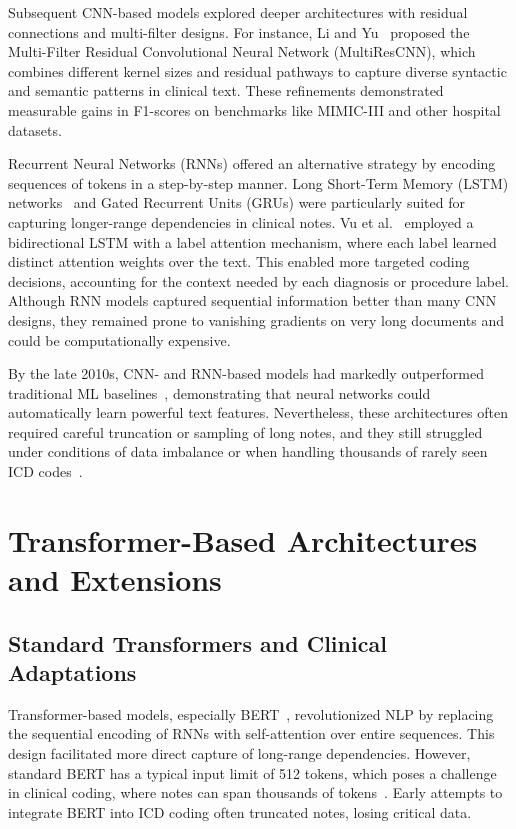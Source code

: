 Subsequent CNN-based models explored deeper architectures with residual connections and multi-filter designs. For instance, Li and Yu~\citep{li2020multi} proposed the Multi-Filter Residual Convolutional Neural Network (MultiResCNN), which combines different kernel sizes and residual pathways to capture diverse syntactic and semantic patterns in clinical text. These refinements demonstrated measurable gains in F1-scores on benchmarks like MIMIC-III and other hospital datasets.

Recurrent Neural Networks (RNNs) offered an alternative strategy by encoding sequences of tokens in a step-by-step manner. Long Short-Term Memory (LSTM) networks~\citep{hochreiter1997long} and Gated Recurrent Units (GRUs) were particularly suited for capturing longer-range dependencies in clinical notes. Vu et al.~\citep{vu2020label, vu2020ijcai} employed a bidirectional LSTM with a label attention mechanism, where each label learned distinct attention weights over the text. This enabled more targeted coding decisions, accounting for the context needed by each diagnosis or procedure label. Although RNN models captured sequential information better than many CNN designs, they remained prone to vanishing gradients on very long documents and could be computationally expensive. 

By the late 2010s, CNN- and RNN-based models had markedly outperformed traditional ML baselines~\citep{perotte2014diagnosis}, demonstrating that neural networks could automatically learn powerful text features. Nevertheless, these architectures often required careful truncation or sampling of long notes, and they still struggled under conditions of data imbalance or when handling thousands of rarely seen ICD codes~\citep{wrenn2010quantifying}.

\section{Transformer-Based Architectures and Extensions}

\subsection{Standard Transformers and Clinical Adaptations}

Transformer-based models, especially BERT~\citep{devlin2019bert}, revolutionized NLP by replacing the sequential encoding of RNNs with self-attention over entire sequences. This design facilitated more direct capture of long-range dependencies. However, standard BERT has a typical input limit of 512 tokens, which poses a challenge in clinical coding, where notes can span thousands of tokens~\citep{gao2021limitations}. Early attempts to integrate BERT into ICD coding often truncated notes, losing critical data. 

